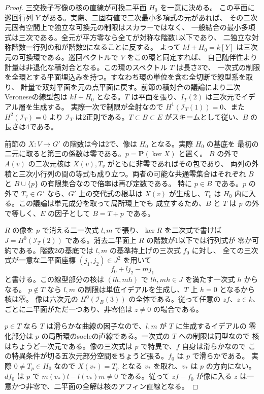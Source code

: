 \begin{proof}
三交換子写像の核の直線が可換二平面 $H_0$ を一意に決める。
この平面に巡回行列 $Y$ がある。実際、二固有値で二次最小多項式の元があれば、
その二次元固有空間上で独立な可換元の制限はスカラーではなく、
一般結合の最小多項式は三次である。全元が平方零なら全てが対称な階数1以下であり、
二独立な対称階数一行列の和が階数2になることに反する。
よって $kI+H_0=k[Y]$ は三次元の可換環である。巡回ベクトルで $V$ をこの環と同定すれば、
自己随伴性より計量は非退化な積対合となる。この環のスペクトル $T$ は長さ3で、
一次式の制限を全環とする平面埋込みを持つ。すなわち環の単位を含む全切断で線型系を取り、
計量で双対平面を元の点平面に戻す。前節の積対合の議論により二次Veroneseの線型包は
$kI+H_0$ となる。$T$ は平面を張り、$I_T(2)$ は三次元でイデアル層を生成する。
実際一次で制限が全射なので $H^1(\mathcal I_T(1))=0$、また $H^2(\mathcal I_T)=0$ より
$\mathcal I_T$ は2正則である。$T\subset B\subset E$ がスキームとして従い、$B$ の長さは4である。

前節の $X:V\to G'$ の階数は今は2で、像は $H_0$ となる。実際 $H_0$ の基底を
最初の二元に取ると第三の係数は零である。$p=\mathbf P(\ker X)$ と置く。
$B$ の外で $A(v)$ の二次元核は $X(v),T_v$ がともに非零であればその包であり、
両列の外積と三次小行列の間の等式も成り立つ。両者の可能な共通零集合はそれぞれ
$B$ と $B\cup\{p\}$ の有限集合なので倍率は再び定数である。
特に $p\in B$ である。$p$ の外で $T_v\in G'$ なら、$G'$ 上の交代式の根基は
$X(v)$ が生成し、$T_v$ は $H_0$ 内に入る。この議論は単元成分を取って局所環上でも
成立するため、$B$ と $T$ は $p$ の外で等しく、$E$ の因子として $B=T+p$ である。

$R$ の像を $p$ で消える二一次式 $l,m$ で張り、$\ker R$ を二次式で書けば
$J=H^0(\mathcal I_T(2))$ である。消去二平面上 $R$ の階数が1以下では行列式が
零か可約である。階数2の基底では $l,m$ の基準持上げの三次式 $f_0$ に対し、
全ての三次式が一意な二平面座標 $(j_1,j_2)\in J^2$ を用いて
\[
                     f_0+l j_2-m j_1
\]
と書ける。この線型部分の核は $(l h,m h)$ で $l h,m h\in J$ を満たす一次式 $h$ からなる。
$p\notin T$ なら $l,m$ の制限は単位イデアルを生成し、$T$ 上 $h=0$ となるから核は零。
像は六次元の $H^0(\mathcal I_B(3))$ の全体である。従って任意の $zf$、$z\in k$、
ごとに二平面がただ一つあり、非零倍は $z\ne0$ の場合である。

$p\in T$ なら $T$ は滑らかな曲線の因子なので、$l,m$ が $T$ に生成するイデアルの
零化部分は $p$ の局所環のsocleの直線である。一次式の $T$ への制限は同型なので
核はちょうど一次元である。像の三次式は $p$ で特異で、$f$ 自身は滑らかなので
この特異条件が切る五次元部分空間をちょうど張る。$f_0$ は $p$ で滑らかである。
実際 $0\ne T_p\in H_0$ なので $X(v_*)=T_p$ となる $v_*$ を取れ、$v_*$ は $p$ の方向にない。
$df_0$ は $p$ で $m(v_*)l-l(v_*)m\ne0$ である。従って $zf-f_0$ が像に入る
$z$ は一意かつ非零で、二平面の全解は核のアフィン直線となる。


\end{proof}
